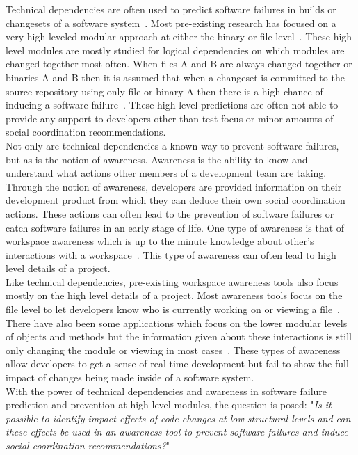 \documentclass[conference]{IEEEtran}
\begin{document}
Technical dependencies are often used to predict software failures in builds or changesets of
a software system~\cite{Pinzger:2008:DNP, Zimmermann:2008:PDU}. Most pre-existing research
has focused on a very high leveled modular approach at either the binary or file level~\cite{Kim:2006:AIB}. 
These high level
modules are mostly studied for logical dependencies on which modules are changed together most
often. When files A and B are always changed together or binaries A and B then it is assumed that
when a changeset is committed to the source repository using only file or binary A then there is
a high chance of inducing a software failure~\cite{Beyer:2005:CSA}. These high level predictions are often not able to
provide any support to developers other than test focus or minor amounts of social
coordination recommendations.\\

Not only are technical dependencies a known way to prevent software failures, but as is the 
notion of awareness. Awareness is the ability to know and understand what actions
other members of a development team are taking. Through the notion of awareness, developers
are provided information on their development product from which they can deduce their
own social coordination actions. These actions can often lead to the prevention of software
failures or catch software failures in an early stage of life. One type of awareness is that of
workspace awareness which is up to the minute knowledge about other's interactions
with a workspace~\cite{Gutwin:1996:WAR, Gutwin:1996:USA}. This type of awareness can
often lead to high level details of a project.\\

Like technical dependencies, pre-existing workspace awareness tools also focus mostly on the high level
details of a project. Most awareness tools focus on the file level to let developers know who
is currently working on or viewing a file~\cite{Biehl:2007:FVD}. There have also been some applications which focus
on the lower modular levels of objects and methods but the information given about these
interactions is still only changing the module or viewing in most cases~\cite{Biehl:2007:FVD}.
These types of awareness
allow developers to get a sense of real time development but fail to show the full impact
of changes being made inside of a software system.\\

With the power of technical dependencies and awareness in software failure prediction and
prevention at high level modules, the question is posed:
"\textit{Is it possible to identify impact effects of code changes at low structural levels and can
these effects be used in an awareness tool to prevent software failures and induce social
coordination recommendations?}"\\
\end{document}
